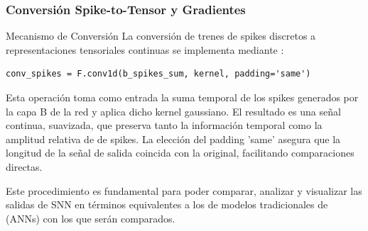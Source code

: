 


\subsubsection {Conversión Spike-to-Tensor y Gradientes}
Mecanismo de Conversión
La conversión de trenes de spikes discretos a representaciones tensoriales continuas se implementa mediante :

\begin{verbatim}
conv_spikes = F.conv1d(b_spikes_sum, kernel, padding='same')
\end{verbatim}

Esta operación toma como entrada la suma temporal de los spikes generados por la capa B de la red y aplica dicho kernel gaussiano. El resultado es una señal continua, suavizada, que preserva tanto la información temporal como la amplitud relativa de de spikes. La elección del padding 'same' asegura que la longitud de la señal de salida coincida con la original, facilitando comparaciones directas.

Este procedimiento es fundamental para poder comparar, analizar y visualizar las salidas de SNN en términos equivalentes a los de modelos tradicionales de (ANNs) con los que serán comparados.

    
    
    

